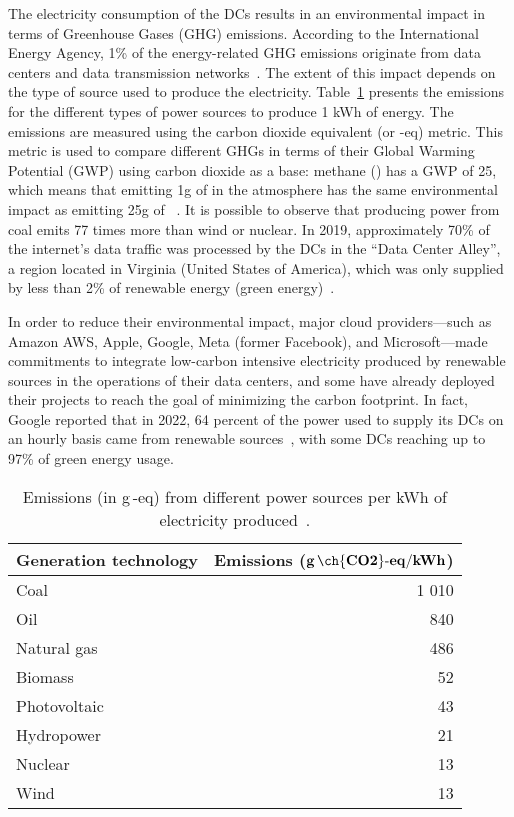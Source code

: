 The electricity consumption of the DCs results in an environmental impact in terms of Greenhouse Gases (GHG) emissions. According to the International Energy Agency, 1\% of the energy-related GHG emissions originate from data centers and data transmission networks~\cite{IEA_2022}. The extent of this impact depends on the type of source used to produce the electricity. Table~\ref{tab:co2_power_sources} presents the emissions for the different types of power sources to produce 1 kWh of energy. The emissions are measured using the carbon dioxide equivalent (or -eq)  metric. This metric is used to compare different GHGs in terms of their Global Warming Potential (GWP) using carbon dioxide as a base: methane () has a GWP of 25, which means that emitting 1g of  in the atmosphere has the same environmental impact as emitting 25g of ~\cite{eurostat_co2_eq}. It is possible to observe that producing power from coal emits 77 times more  than wind or nuclear. In 2019, approximately 70\% of the internet's data traffic was processed by the DCs in the ``Data Center Alley'', a region located in Virginia (United States of America), which was only supplied by less than 2\% of renewable energy (green energy)~\cite{clicking_clean_virginia}. 

In order to reduce their environmental impact, major cloud providers---such as Amazon AWS, Apple, Google, Meta (former Facebook), and Microsoft---made commitments to integrate low-carbon intensive electricity produced by renewable sources in the operations of their data centers, and some have already deployed their projects to reach the goal of minimizing the carbon footprint. In fact, Google reported that in 2022, 64 percent of the power used to supply its DCs on an hourly basis came from renewable sources~\cite{google_sustainability_report_2023}, with some DCs reaching up to 97\% of green energy usage.

\begin{table}[!ht]

\caption{ Emissions (in g\,-eq) from different power sources per kWh of electricity produced~\cite{nrel_lifecycle_2021}.}\label{tab:co2_power_sources} \centering

\begin{tabular}{|l|r|}
  \hline
  \textbf{Generation technology} & \textbf{Emissions ($\mathbf{g\,\ch{CO2}\text{-}eq/kWh}$)}   \\
  \hline  
  Coal   & 1 010\\  
  \hline
  Oil   & 840\\
  \hline
  Natural gas   & 486\\
   \hline
  Biomass   & 52 \\
  \hline
  Photovoltaic   & 43 \\
  \hline
  Hydropower & 21 \\
  \hline
  Nuclear   & 13 \\
  \hline
  Wind   & 13 \\
  \hline
\end{tabular}
\end{table}


